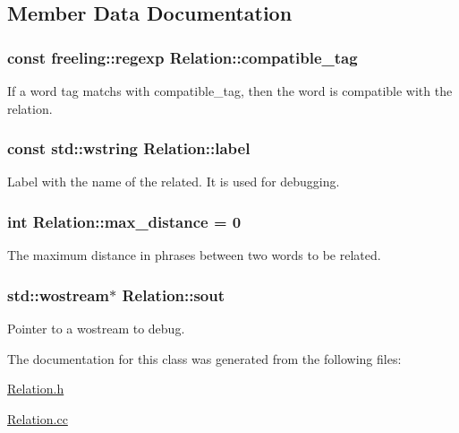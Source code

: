 \subsection{Member Data Documentation}
\hypertarget{classRelation_a3c44dc364bd5530017a4828fee9a14bf}{}
\subsubsection[{compatible\+\_\+tag}]{\setlength{\rightskip}{0pt plus 5cm}const freeling\+::regexp Relation\+::compatible\+\_\+tag\hspace{0.3cm}{\ttfamily [protected]}}\label{classRelation_a3c44dc364bd5530017a4828fee9a14bf}


If a word tag matchs with compatible\+\_\+tag, then the word is compatible with the relation. 

\hypertarget{classRelation_a4885622334809b177f87b9034d9218fe}{}
\subsubsection[{label}]{\setlength{\rightskip}{0pt plus 5cm}const std\+::wstring Relation\+::label}\label{classRelation_a4885622334809b177f87b9034d9218fe}


Label with the name of the related. It is used for debugging. 

\hypertarget{classRelation_a634818cf4618e3862961d457e8ba0448}{}
\subsubsection[{max\+\_\+distance}]{\setlength{\rightskip}{0pt plus 5cm}int Relation\+::max\+\_\+distance = 0\hspace{0.3cm}{\ttfamily [static]}}\label{classRelation_a634818cf4618e3862961d457e8ba0448}


The maximum distance in phrases between two words to be related. 

\hypertarget{classRelation_a44deec0ee05d803ea23e14520fd57a75}{}
\subsubsection[{sout}]{\setlength{\rightskip}{0pt plus 5cm}std\+::wostream$\ast$ Relation\+::sout\hspace{0.3cm}{\ttfamily [protected]}}\label{classRelation_a44deec0ee05d803ea23e14520fd57a75}


Pointer to a wostream to debug. 



The documentation for this class was generated from the following files\+:\begin{DoxyCompactItemize}
\item 
\hyperlink{Relation_8h}{Relation.\+h}\item 
\hyperlink{Relation_8cc}{Relation.\+cc}\end{DoxyCompactItemize}
